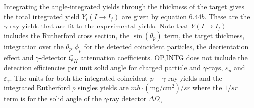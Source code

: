 \documentclass[10pt]{article}
\begin{document}
Integrating the angle-integrated yields through the thickness of the target gives the total integrated yield $Y_{i}\left(I \rightarrow I_{f}\right)$ are given by equation $6.44 b$. These are the $\gamma$-ray yields that are fit to the experimental yields. Note that $Y\left(I \rightarrow I_{f}\right)$ includes the Rutherford cross section, the $\sin \left(\theta_{p}\right)$ term, the target thickness, integration over the $\theta_{p}, \phi_{p}$ for the detected coincident particles, the deorientation effect and $\gamma$-detector $Q_{K}$ attenuation coefficients. OP,INTG does not include the detection efficiencies per unit solid angle for charged particle and $\gamma$-rays, $\varepsilon_{p}$ and $\varepsilon_{\gamma}$. The units for both the integrated coincident $p-\gamma$-ray yields and the integrated Rutherford $p$ singles yields are $m b \cdot\left(\mathrm{mg} / \mathrm{cm}^{2}\right) / s r$ where the $1 / s r$ term is for the solid angle of the $\gamma$-ray detector $\Delta \Omega_{\gamma}$
\end{document}
